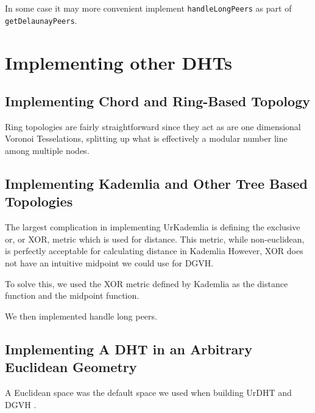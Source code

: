 \documentclass[11pt,conference]{IEEEtran}
\begin{document}
In some case it may more convenient implement \texttt{handleLongPeers} as part of \texttt{getDelaunayPeers}.





\section{Implementing other DHTs}
\label{sec:implement}
\subsection{Implementing Chord and Ring-Based Topology}

Ring topologies are fairly straightforward since they act as are one dimensional Voronoi Tesselations, splitting up what is effectively a modular number line among multiple nodes.





\subsection{Implementing Kademlia and Other Tree Based Topologies}
The largest complication in implementing UrKademlia is defining the exclusive or, or XOR, metric which is used for distance.
This metric, while non-euclidean, is perfectly acceptable for calculating distance in Kademlia \cite{kademlia}
However, XOR does not have an intuitive midpoint we could use for DGVH.

To solve this, we used the XOR metric defined by Kademlia as the distance function and the midpoint function.



We then implemented handle long peers.

\subsection{Implementing A DHT in an Arbitrary Euclidean Geometry}

A Euclidean space was the default space we used when building UrDHT and DGVH \cite{dgvh}.
\end{document}
